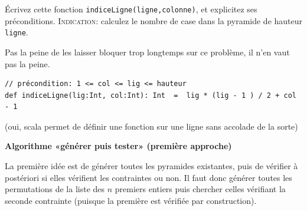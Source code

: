 \documentclass[10pt]{article}\usepackage[nu]{esial}
\begin{document}
\begin{Question}
  Écrivez cette fonction \texttt{indiceLigne(ligne,colonne)}, et explicitez ses préconditions.
  \noindent\textsc{Indication:} calculez le nombre de case dans la pyramide de
  hauteur \texttt{ligne}.
\end{Question}
\begin{Reponse}
  Pas la peine de les laisser bloquer trop longtemps sur ce problème, il n'en
  vaut pas la peine.

\begin{Verbatim}
// précondition: 1 <= col <= lig <= hauteur 
def indiceLigne(lig:Int, col:Int): Int  =  lig * (lig - 1 ) / 2 + col - 1
\end{Verbatim}
(oui, scala permet de définir une fonction sur une ligne sans accolade de la sorte)
\end{Reponse}




\begin{Exercice}\textbf{Algorithme «générer puis tester» (première approche)}

  \noindent La première idée est de générer toutes les pyramides existantes,
  puis de vérifier à postériori si elles vérifient les contraintes ou non. Il
  faut donc générer toutes les permutations de la liste des $n$ premiers
  entiers puis chercher celles vérifiant la seconde contrainte (puisque la
  première est vérifiée par construction).
\end{Exercice}
\end{document}
